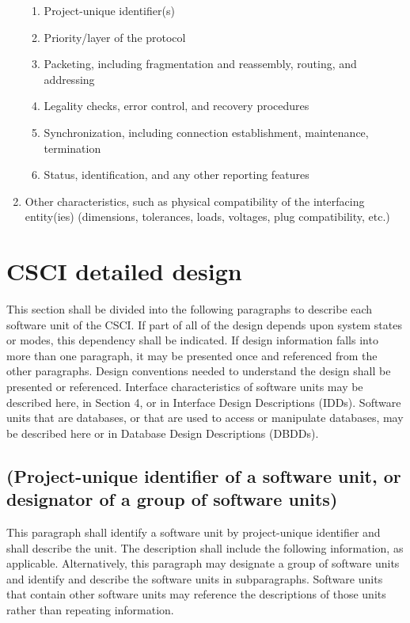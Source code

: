 \begin{enumerate}
  \begin{enumerate}
  \itemsep1pt\parskip0pt
  \item
    Project-unique identifier(s)
  \item
    Priority/layer of the protocol
  \item
    Packeting, including fragmentation and reassembly, routing, and
    addressing
  \item
    Legality checks, error control, and recovery procedures
  \item
    Synchronization, including connection establishment, maintenance,
    termination
  \item
    Status, identification, and any other reporting features
  \end{enumerate}
\item
  Other characteristics, such as physical compatibility of the
  interfacing entity(ies) (dimensions, tolerances, loads, voltages, plug
  compatibility, etc.)
\end{enumerate}

\section{CSCI detailed design}

This section shall be divided into the following paragraphs to describe
each software unit of the CSCI. If part of all of the design depends
upon system states or modes, this dependency shall be indicated. If
design information falls into more than one paragraph, it may be
presented once and referenced from the other paragraphs. Design
conventions needed to understand the design shall be presented or
referenced. Interface characteristics of software units may be described
here, in Section 4, or in Interface Design Descriptions (IDDs). Software
units that are databases, or that are used to access or manipulate
databases, may be described here or in Database Design Descriptions
(DBDDs).

\subsection{(Project-unique identifier of a software unit, or
designator of a group of software units)}

This paragraph shall identify a software unit by project-unique
identifier and shall describe the unit. The description shall include
the following information, as applicable. Alternatively, this paragraph
may designate a group of software units and identify and describe the
software units in subparagraphs. Software units that contain other
software units may reference the descriptions of those units rather than
repeating information.

